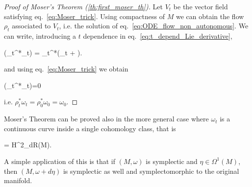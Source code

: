 \documentclass[main.tex]{subfiles}
\begin{document}
\begin{proof}[Proof of Moser's Theorem (\ref{th:first_moser_th})]
	Let $V_t$ be the vector field satisfying eq.~\eqref{eq:Moser_trick}. Using compactness of $M$ we can obtain the flow $\rho_t$ associated to $V_t$, i.e. the solution of eq.~\eqref{eq:ODE_flow_non_autonomous}. We can write, introducing a $t$ dependence in eq.~\eqref{eq:t_depend_Lie_derivative}, 
	\begin{eqalign}
	\label{eq:der_of_flowing_symp}
		(\rho_t^*\omega_t) = \rho_t^*\left(\omega_t + \right).
	\end{eqalign}
	and using eq.~\eqref{eq:Moser_trick} we obtain
	\begin{eqalign}
		(\rho_t^*\omega_t)=0
	\end{eqalign}
	i.e. $\rho_t^*\omega_t = \rho_0^*\omega_0 = \omega_0$. 
\end{proof}

\begin{remark}
	Moser's Theorem can be proved also in the more general case where $\omega_t$ is a continuous curve inside a single cohomology class, that is
	\begin{eqalign}
		  =  \in H^2_{dR}(M).
	\end{eqalign}
	A simple application of this is that if $(M, \omega)$ is symplectic and $\eta \in \Omega^1(M)$, then $(M, \omega + d\eta)$ is symplectic as well and symplectomorphic to the original manifold.
\end{remark}
\end{document}
